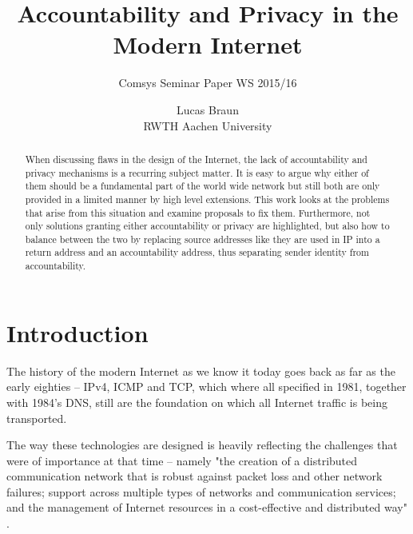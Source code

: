 \documentclass{acm_proc_article-sp}
\begin{document}
\title{Accountability and Privacy in the Modern Internet}
\subtitle{Comsys Seminar Paper WS 2015/16}

\author{
\alignauthor
Lucas Braun\\
	RWTH Aachen University \\
}

\maketitle
\begin{abstract}
When discussing flaws in the design of the Internet, the lack of accountability and privacy mechanisms is a recurring subject matter. It is easy to argue why either of them should be a fundamental part of the world wide network but still both are only provided in a limited manner by high level extensions. This work looks at the problems that arise from this situation and examine proposals to fix them. Furthermore, not only solutions granting either accountability or privacy are highlighted, but also how to balance between the two by replacing source addresses like they are used in IP into a return address and an accountability address, thus separating sender identity from accountability.
\end{abstract}

\section{Introduction}
The history of the modern Internet as we know it today goes back as far as the early eighties -- IPv4, ICMP and TCP, which where all specified in 1981, together with 1984's DNS, still are the foundation on which all Internet traffic is being transported.

The way these technologies are designed is heavily reflecting the challenges that were of importance at that time -- namely "the creation of a distributed communication network that is robust against packet loss and other network failures; support across multiple types of networks and communication services; and the management of Internet resources in a cost-effective and distributed way" \cite{mot}.
\end{document}
